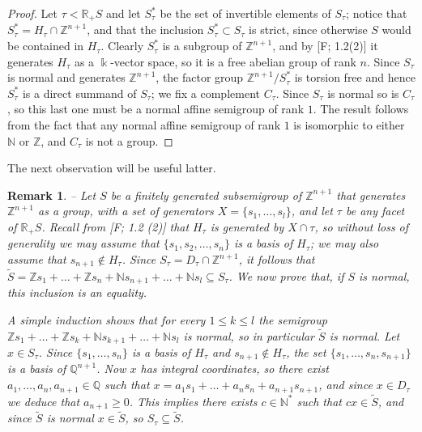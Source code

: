 \documentclass[twoside,11pt]{article}
\renewcommand{\k}{\Bbbk}
\newcommand{\N}{{\mathbb N}}
\newcommand{\Z}{{\mathbb Z}}
\newcommand{\QQ}{{\mathbb Q}}
\newcommand{\RR}{{\mathbb R}}
\newtheorem{subremark}[subtheorem]{Remark}
\begin{document}
\begin{proof}
Let $\tau < \RR_+S$ and let $S_\tau^*$ be the set of invertible elements of $S_\tau$; 
notice that $S_\tau^* = H_\tau \cap \Z^{n+1}$, and that the inclusion $S_\tau^* \subset
S_\tau$ is strict, since otherwise $S$ would be contained in $H_\tau$. Clearly $S_\tau^*$
is a subgroup of $\Z^{n+1}$, and by [F; 1.2(2)] it generates $H_\tau$ as a $\k$-vector space,
so it is a free abelian group of rank $n$. Since $S_\tau$ is normal and generates
$\Z^{n+1}$, the factor group $\Z^{n+1}/S_\tau^*$ is torsion free and hence $S_\tau^*$ is a
direct summand of $S_\tau$; we fix a complement $C_\tau$. Since $S_\tau$ is normal so is
$C_\tau$, so this last one must be a normal affine semigroup of rank $1$. The result
follows from the fact that any normal affine semigroup of rank $1$ is isomorphic to either
$\N$ or $\Z$, and $C_\tau$ is not a group.
\end{proof}

The next observation will be useful latter.

\begin{subremark} -- \rm
\label{remarque-sur-generateurs}
Let $S$ be a finitely generated subsemigroup of $\Z^{n+1}$ that generates $\Z^{n+1}$ as a
group, with a set of generators $X = \{s_1,\dots,s_l\}$, and let $\tau$ be any facet of
$\RR_+S$. Recall from [F; 1.2 (2)] that $H_\tau$ is generated by $X \cap \tau$, so without 
loss of generality we may assume that $\{s_1, s_2, \ldots, s_n\}$ is a basis of $H_\tau$;
we may also assume that $s_{n+1} \notin H_\tau$. Since $S_\tau = D_\tau \cap \Z^{n+1}$, it
follows that $\tilde S = \Z s_1 + \dots + \Z s_n + \N s_{n+1} + \dots + \N s_l \subseteq
S_\tau$. We now prove that, if $S$ is normal, this inclusion is an equality.

A simple induction shows that for every $1 \leq k \leq l$ the semigroup $\Z s_1 + \dots +
\Z s_k + \N s_{k+1} + \dots + \N s_l$ is normal, so in particular $\tilde S$ is normal. 
Let $x \in S_\tau$. Since $\{s_1, \ldots, s_n\}$ is a basis of $H_\tau$ and $s_{n+1}
\notin H_\tau$, the set $\{s_1, \ldots, s_n, s_{n+1}\}$ is a basis of $\QQ^{n+1}$. Now
$x$ has integral coordinates, so there exist $a_1,\dots,a_n, a_{n+1} \in \QQ$ such that $x
= a_1 s_1 + \dots + a_n s_n + a_{n+1} s_{n+1}$, and since $x \in D_\tau$ we deduce that
$a_{n+1} \geq 0$. This implies there exists $c \in\N^*$ such that $cx \in \tilde
S$, and since $\tilde S$ is normal $x \in \tilde S$, so $S_\tau \subseteq \tilde S$.
\end{subremark}
\end{document}
